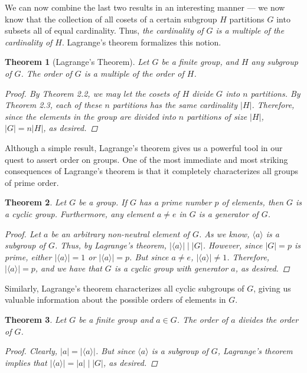 \documentclass[openany, amssymb, psamsfonts]{amsart}
\newtheorem{thm}{Theorem}[section]
\theoremstyle{definition}
\numberwithin{equation}{section}
\begin{document}
We can now combine the last two results in an interesting manner --- we now know that the collection of all cosets of a certain subgroup $H$ partitions $G$ into subsets all of equal cardinality. Thus, \emph{the cardinality of $G$ is a multiple of the cardinality of $H$}. Lagrange's theorem formalizes this notion.
\begin{thm}[Lagrange's Theorem]
    Let $G$ be a finite group, and $H$ any subgroup of $G$. The order of $G$ is a multiple of the order of $H$.
    \begin{proof}
        By Theorem 2.2, we may let the cosets of $H$ divide $G$ into $n$ partitions. By Theorem 2.3, each of these $n$ partitions has the same cardinality $|H|$. Therefore, since the elements in the group are divided into $n$ partitions of size $|H|$, $|G|=n|H|$, as desired.
    \end{proof}
\end{thm}\par
Although a simple result, Lagrange's theorem gives us a  powerful tool in our quest to assert order on groups. One of the most immediate and most striking consequences of Lagrange's theorem is that it completely characterizes all groups of prime order.
\begin{thm}
    Let $G$ be a group. If $G$ has a prime number $p$ of elements, then $G$ is a cyclic group. Furthermore, any element $a\neq e$ in $G$ is a generator of $G$.
    \begin{proof}
        Let $a$ be an arbitrary non-neutral element of $G$. As we know, $\langle a\rangle$ is a subgroup of $G$. Thus, by Lagrange's theorem, $|\langle a\rangle|\mid|G|$. However, since $|G|=p$ is prime, either $|\langle a\rangle|=1$ or $|\langle a\rangle|=p$. But since $a\neq e$, $|\langle a\rangle|\neq 1$. Therefore, $|\langle a\rangle|=p$, and we have that $G$ is a cyclic group with generator $a$, as desired.
    \end{proof}
\end{thm}
Similarly, Lagrange's theorem characterizes all cyclic subgroups of $G$, giving us valuable information about the possible orders of elements in $G$.
\begin{thm}
    Let $G$ be a finite group and $a\in G$. The order of $a$ divides the order of $G$.
    \begin{proof}
        Clearly, $|a|=|\langle a\rangle|$. But since $\langle a\rangle$ is a subgroup of $G$, Lagrange's theorem implies that $|\langle a\rangle|=|a|\mid|G|$, as desired.
    \end{proof}
\end{thm}
\end{document}
